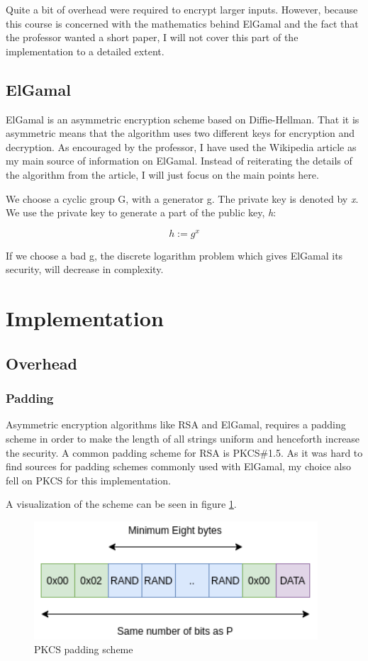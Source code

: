 \documentclass{article}
\begin{document}
Quite a bit of overhead were required to encrypt larger inputs. However, because this course is concerned with the mathematics behind ElGamal and the fact that the professor wanted a short paper, I will not cover this part of the implementation to a detailed extent.


\subsection{ElGamal}
ElGamal is an asymmetric encryption scheme based on Diffie-Hellman. That it is asymmetric means that the algorithm uses two different keys for encryption and decryption. As encouraged by the professor, I have used the Wikipedia article\cite{WIKI} as my main source of information on ElGamal. Instead of reiterating the details of the algorithm from the article, I will just focus on the main points here.

We choose a cyclic group G, with a generator g. The private key is denoted by \textit{x}. We use the private key to generate a part of the public key, \textit{h}:

\begin{equation}
h := g^{x}
\end{equation}

If we choose a bad g, the discrete logarithm problem which gives ElGamal its security, will decrease in complexity.

\section{Implementation}


\subsection{Overhead}

\subsubsection{Padding}
Asymmetric encryption algorithms like RSA and ElGamal, requires a padding scheme in order to make the length of all strings uniform and henceforth increase the security. A common padding scheme for RSA is PKCS\#1.5. As it was hard to find sources for padding schemes commonly used with ElGamal, my choice also fell on PKCS for this implementation.

A visualization of the scheme can be seen in figure \ref{rPKCS}.


\begin{figure}[H]
 \centering
  \includegraphics[width=300pt]{img/padding.png}
 \caption{PKCS padding scheme}
 \label{rPKCS}
 \end{figure}
\end{document}
